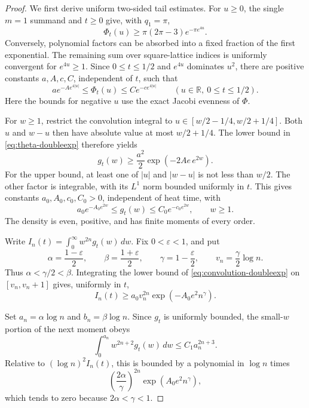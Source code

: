 \begin{proof}
We first derive uniform two-sided tail estimates.
For $u\ge0$, the single $m=1$ summand and $t\ge0$
give, with $q_1=\pi$,
\[
\Phi_t(u)\ge
\pi(2\pi-3)e^{-\pi e^{4u}}.
\]
Conversely, polynomial factors can be absorbed into
a fixed fraction of the first exponential.
The remaining sum over square-lattice indices
is uniformly convergent for $e^{4u}\ge1$.
Since $0\le t\le1/2$ and $e^{4u}$
dominates $u^2$, there are positive constants
$a,A,c,C$, independent of $t$, such that
\begin{equation}\label{eq:theta-doubleexp}
a e^{-A e^{4|u|}}
\le\Phi_t(u)\le C e^{-c e^{4|u|}}
\qquad (u\in\mathbb R,\ 0\le t\le1/2).
\end{equation}
Here the bounds for negative $u$ use the exact
Jacobi evenness of $\Phi$.

For $w\ge1$, restrict the convolution integral
to $u\in[w/2-1/4,w/2+1/4]$. Both $u$ and $w-u$
then have absolute value at most $w/2+1/4$.
The lower bound in \eqref{eq:theta-doubleexp}
therefore yields
\[
g_t(w)\ge
\frac{a^2}{2}
\exp(-2Ae\,e^{2w}).
\]
For the upper bound, at least one of $|u|$ and
$|w-u|$ is not less than $w/2$.
The other factor is integrable, with its $L^1$
norm bounded uniformly in $t$.
This gives constants $a_0,A_0,c_0,C_0>0$,
independent of heat time, with
\begin{equation}\label{eq:convolution-doubleexp}
a_0e^{-A_0 e^{2w}}
\le g_t(w)\le C_0e^{-c_0 e^{2w}},
\qquad w\ge1.
\end{equation}
The density is even, positive, and has finite
moments of every order.

Write $I_n(t)=\int_0^\infty w^{2n}g_t(w)\,dw$.
Fix $0<\varepsilon<1$, and put
\[
\alpha=\frac{1-\varepsilon}{2},\qquad
\beta=\frac{1+\varepsilon}{2},\qquad
\gamma=1-\frac{\varepsilon}{2},\qquad
v_n=\frac\gamma2\log n.
\]
Thus $\alpha<\gamma/2<\beta$.
Integrating the lower bound of
\eqref{eq:convolution-doubleexp} on
$[v_n,v_n+1]$ gives, uniformly in $t$,
\begin{equation}\label{eq:denom-lower}
I_n(t)\ge
a_0 v_n^{2n}\exp(-A_0e^2 n^\gamma).
\end{equation}

Set $a_n=\alpha\log n$ and $b_n=\beta\log n$.
Since $g_t$ is uniformly bounded, the
small-$w$ portion of the next moment obeys
\[
\int_0^{a_n}w^{2n+2}g_t(w)\,dw
\le C_1 a_n^{2n+3}.
\]
Relative to $(\log n)^2 I_n(t)$,
this is bounded by a polynomial in $\log n$
times
\[
\left(\frac{2\alpha}{\gamma}\right)^{2n}
\exp(A_0e^2n^\gamma),
\]
which tends to zero because $2\alpha<\gamma<1$.


\end{proof}
